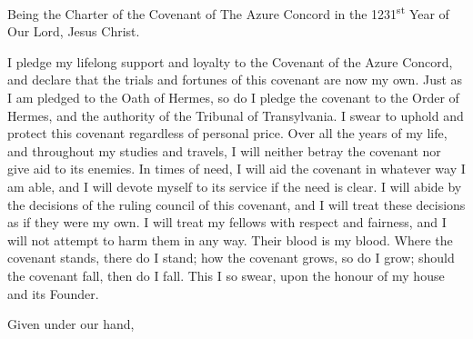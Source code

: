 \documentclass [a4paper,portrait]{article}
\begin{document}
\setlength{\columnsep}{8mm}
\setlength{\parskip}{0.1em}
\pagestyle{empty}
\title{\fontsize{50}{60}\selectfont{The Oath of Covenant of the Azure Concord}}
\author{\large Ashe of Criamon}
\date{\large 21\textsuperscript{st} December 1231}
\maketitle
{}
\large{{Being the Charter of the Covenant of The Azure Concord in the 1231\textsuperscript{st} Year of Our Lord, Jesus Christ.}}

\vspace*{5mm}
\noindent
\normalsize{I pledge my lifelong support and loyalty to the Covenant of the Azure Concord, and declare that the
	trials and fortunes of this covenant are now my own. Just as I am pledged to the Oath of Hermes, so
	do I pledge the covenant to the Order of Hermes, and the authority of the Tribunal of Transylvania.
	I swear to uphold and protect this covenant regardless of personal price. Over all the years of my
	life, and throughout my studies and travels, I will neither betray the covenant nor give aid to its
	enemies. In times of need, I will aid the covenant in whatever way I am able, and I will devote 
	myself to its service if the need is clear. I will abide by the decisions of the ruling council of
	this covenant, and I will treat these decisions as if they were my own. I will treat my fellows with
	respect and fairness, and I will not attempt to harm them in any way. Their blood is my blood. Where
	the covenant stands, there do I stand; how the covenant grows, so do I grow; should the covenant
	fall, then do I fall. This I so swear, upon the honour of my house and its Founder.}

\large{Given under our hand,}

\vspace{40mm}
\end{document}
